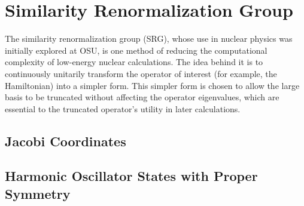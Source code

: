\section{Similarity Renormalization Group}

The similarity renormalization group (SRG), whose use in nuclear physics was initially explored at OSU, is one method of reducing the computational complexity of low-energy nuclear calculations. The idea behind it is to continuously unitarily transform the operator of interest (for example, the Hamiltonian) into a simpler form. This simpler form is chosen to allow the large basis to be truncated without affecting the operator eigenvalues, which are essential to the truncated operator's utility in later calculations.

\subsection{Jacobi Coordinates}

\subsection{Harmonic Oscillator States with Proper Symmetry}
